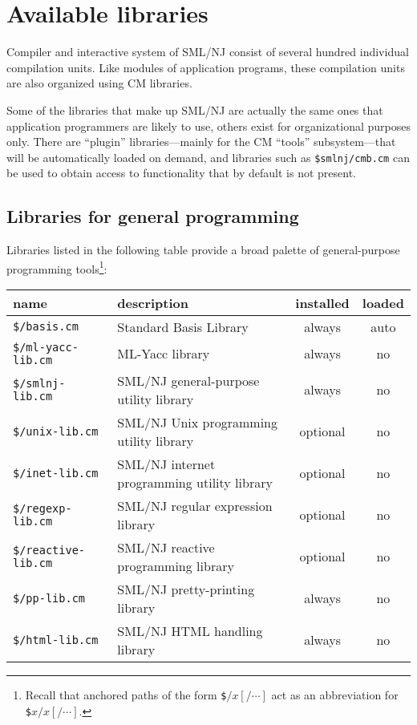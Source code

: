 
\section{Available libraries}

Compiler and interactive system of SML/NJ consist of several hundred
individual compilation units.  Like modules of application programs,
these compilation units are also organized using CM libraries.  

Some of the libraries that make up SML/NJ are actually the same ones
that application programmers are likely to use, others exist for
organizational purposes only.  There are ``plugin'' libraries---mainly
for the CM ``tools'' subsystem---that will be automatically loaded on
demand, and libraries such as {\tt \$smlnj/cmb.cm} can be used to
obtain access to functionality that by default is not present.

\subsection{Libraries for general programming}

Libraries listed in the following table provide a broad palette of
general-purpose programming tools\footnote{Recall that anchored paths
of the form {\tt \$$/x[/\cdots]$} act as an abbreviation for {\tt
\$$x/x[/\cdots]$}.}:

\begin{small}
\begin{center}
\begin{tabular}{p{2.3in}||p{2.8in}|c|c}
name & description & installed & loaded \\
\hline\hline
{\tt \$/basis.cm} & Standard Basis Library & always & auto \\
\hline\hline
{\tt \$/ml-yacc-lib.cm} & ML-Yacc library & always & no \\
\hline\hline
{\tt \$/smlnj-lib.cm} & SML/NJ general-purpose utility library &
always & no \\
\hline
{\tt \$/unix-lib.cm} & SML/NJ Unix programming utility library &
optional & no \\
\hline
{\tt \$/inet-lib.cm} & SML/NJ internet programming utility library &
optional & no \\
\hline
{\tt \$/regexp-lib.cm} & SML/NJ regular expression library & optional
& no \\
\hline
{\tt \$/reactive-lib.cm} & SML/NJ reactive programming library &
optional & no \\
\hline
{\tt \$/pp-lib.cm} & SML/NJ pretty-printing library & always & no \\
\hline
{\tt \$/html-lib.cm} & SML/NJ HTML handling library & always & no
\end{tabular}
\end{center}
\end{small}

